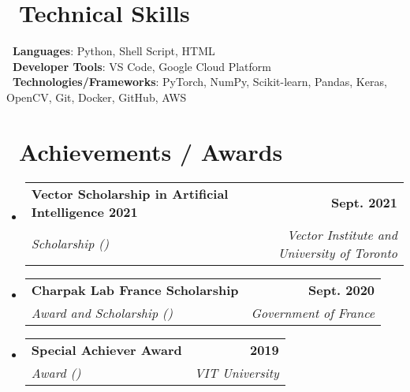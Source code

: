 \documentclass[letterpaper,11pt]{article}
\makeatletter
\newcommand{\resumeSubheading}[4]{
  \vspace{-2pt}\item
    \begin{tabular*}{1.0\textwidth}[t]{l@{\extracolsep{\fill}}r}
      \textbf{#1} & \textbf{\small #2} \\
      \textit{\small#3} & \textit{\small #4} \\
    \end{tabular*}\vspace{-7pt}
}
\newcommand{\resumeSubHeadingListStart}{\begin{itemize}[leftmargin=0.0in, label={}]}
\newcommand{\resumeSubHeadingListEnd}{\end{itemize}}
\makeatother
\begin{document}
\section{\faLaptop \ Technical Skills}
 \begin{itemize}[leftmargin=0.15in, label={}]
    \small{\item{
     \textbf{\faLanguage \ Languages}{: Python, Shell Script, HTML} \\
    \textbf{\faTools \ Developer Tools}{: VS Code, Google Cloud Platform} \\
     \textbf{\faToolbox \ Technologies/Frameworks}{: PyTorch, NumPy, Scikit-learn, Pandas, Keras, OpenCV, Git, Docker, GitHub, AWS} \\
    }}
 \end{itemize}
 \vspace{-16pt}

\section{\faAward \ Achievements / Awards}
    \resumeSubHeadingListStart
        \resumeSubheading{Vector Scholarship in Artificial Intelligence 2021}{Sept. 2021}{Scholarship ({\href{https://vectorinstitute.ai/2021/05/10/newest-vector-ai-scholarship-recipients-join-growing-talent-pool-in-ontario/\#:~:text=Pokhrel\%2C\%20Aslesha-,Sharma\%2C\%20Vasudev,-LeMesurier\%2C\%20Carey}{\faLink}})}{Vector Institute and University of Toronto}
        \resumeSubheading{Charpak Lab France Scholarship}{Sept. 2020}{Award and Scholarship ({\href{https://www.inde.campusfrance.org/result-of-the-charpak-lab-scholarship-programme-2019\#:~:text=12,Toulouse}{\faLink}})}{Government of France}
        \resumeSubheading{Special Achiever Award}{2019}{Award (\href{https://www2.slideshare.net/secret/9CIVAk7yffpwUx}{\faLink})}{VIT University}
    \resumeSubHeadingListEnd
\end{document}
